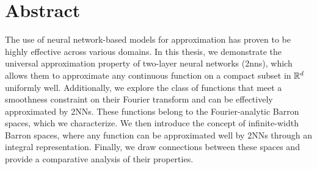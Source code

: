 \chapter*{Abstract}

The use of neural network-based models for approximation has proven to be highly
effective across various domains. In this thesis, we demonstrate the universal
approximation property of two-layer neural networks (\gls{2nn}s), which allows
them to approximate any continuous function on a compact subset in $\mathbb{R}^d$
uniformly well. Additionally, we explore the class of functions that meet a
smoothness constraint on their Fourier transform and can be effectively
approximated by 2NNs. These functions belong to the Fourier-analytic Barron
spaces, which we characterize. We then introduce the concept of infinite-width
Barron spaces, where any function can be approximated well by 2NNs through an
integral representation. Finally, we draw connections between these spaces and
provide a comparative analysis of their properties.

